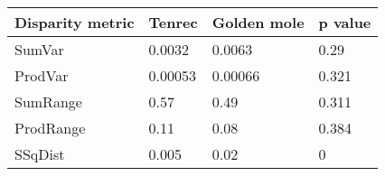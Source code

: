 
\begin{tabular}[t]{l l l l }		
\hline
\textbf{Disparity metric} & \textbf{Tenrec} & \textbf{Golden mole} & \textbf{p value} \\ 
\hline
SumVar & 0.0032 & 0.0063 & 0.29 \\
ProdVar & 0.00053 & 0.00066 & 0.321 \\
SumRange & 0.57 & 0.49 & 0.311 \\
ProdRange & 0.11 & 0.08 & 0.384 \\
SSqDist & 0.005 & 0.02 & 0 \\
\hline
\end{tabular}